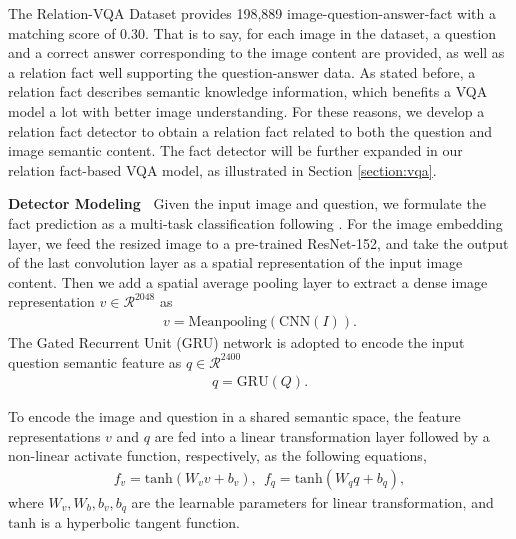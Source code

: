 \documentclass[sigconf]{acmart}
\begin{document}
The Relation-VQA Dataset provides 198,889 image-question-answer-fact with a matching score of 0.30. That is to say, for each image in the dataset, a question and a correct answer corresponding to the image content are provided, as well as a relation fact well supporting the question-answer data. As stated before, a relation fact describes semantic knowledge information, which benefits a VQA model a lot with better image understanding. For these reasons, we develop a relation fact detector to obtain a relation fact related to both the question and image semantic content. The fact detector will be further expanded in our relation fact-based VQA model, as illustrated in Section \ref{section:vqa}.



\textbf{Detector Modeling~} Given the input image and question, we formulate the fact prediction
as a multi-task classification following \cite{li2017vip,liang2017deep}. 
For the image embedding layer, we feed the resized image to a pre-trained ResNet-152\cite{he2016deep},
and take the output of the last convolution layer as a spatial representation of the input image content.
Then we add a spatial average pooling layer to extract a dense image representation $v \in \mathcal{R}^{2048} $  as
\begin{align}
	v= \mathrm{Meanpooling} (\mathrm{CNN}(I)) .
\end{align}
The Gated Recurrent Unit (GRU) network is adopted to encode the input question semantic feature as $q \in \mathcal{R}^{2400} $
\begin{align}
	q = \mathrm{GRU} (Q) .
\end{align}

To encode the image and question in a shared semantic space, the feature representations $v$ and $q$
are fed into a linear transformation layer followed by a non-linear activate function, respectively, as the following equations, 
\begin{align}
	f_v = \mathrm{tanh} (W_vv+b_v), ~~ f_q = \mathrm{tanh} (W_qq+b_q), 
\end{align}
where $W_v, W_b, b_v, b_q$ are the learnable parameters for linear transformation,
and $\mathrm{tanh}$ is a hyperbolic tangent function.
	
\end{document}
